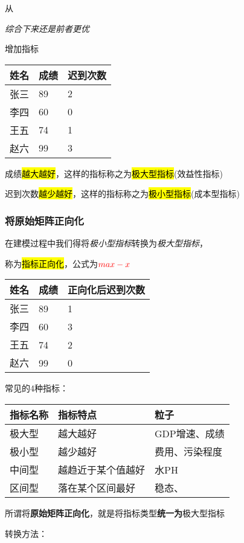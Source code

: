 \documentclass[
]{article}
\begin{document}
从

\emph{综合下来还是前者更优}

增加指标

\begin{longtable}[]{@{}lll@{}}
\toprule
姓名 & 成绩 & 迟到次数\tabularnewline
\midrule
\endhead
张三 & 89 & 2\tabularnewline
李四 & 60 & 0\tabularnewline
王五 & 74 & 1\tabularnewline
赵六 & 99 & 3\tabularnewline
\bottomrule
\end{longtable}

成绩\hl{越大越好}，这样的指标称之为\hl{极大型指标}(效益性指标)

迟到次数\hl{越少越好}，这样的指标称之为\hl{极小型指标}(成本型指标)

\hypertarget{ux5c06ux539fux59cbux77e9ux9635ux6b63ux5411ux5316}{%
\subsubsection{将原始矩阵正向化}\label{ux5c06ux539fux59cbux77e9ux9635ux6b63ux5411ux5316}}

在建模过程中我们得将\emph{极小型指标}转换为\emph{极大型指标}，

称为\hl{指标正向化}，公式为\(\textcolor{red}{max-x}\)

\begin{longtable}[]{@{}lll@{}}
\toprule
姓名 & 成绩 & 正向化后迟到次数\tabularnewline
\midrule
\endhead
张三 & 89 & 1\tabularnewline
李四 & 60 & 3\tabularnewline
王五 & 74 & 2\tabularnewline
赵六 & 99 & 0\tabularnewline
\bottomrule
\end{longtable}

常见的4种指标：

\begin{longtable}[]{@{}lll@{}}
\toprule
指标名称 & 指标特点 & 粒子\tabularnewline
\midrule
\endhead
极大型 & 越大越好 & GDP增速、成绩\tabularnewline
极小型 & 越少越好 & 费用、污染程度\tabularnewline
中间型 & 越趋近于某个值越好 & 水PH\tabularnewline
区间型 & 落在某个区间最好 & 稳态、\tabularnewline
\bottomrule
\end{longtable}

所谓将\textbf{原始矩阵正向化}，就是将指标类型\textbf{统一为}极大型指标

转换方法：
\end{document}
